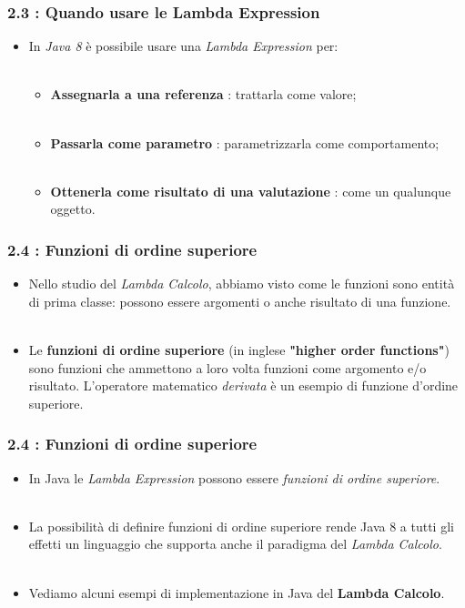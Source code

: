 \documentclass{beamer}
\begin{document}
\begin{frame}
	\frametitle{\textbf{2.3 : Quando usare le Lambda Expression}}
	\begin{itemize}
		\item
			In \textit{Java 8} \`e possibile usare una \textit{Lambda Expression} per:\\\
		\begin{itemize}
			\item
				\textbf{Assegnarla a una referenza} : trattarla come valore;\\\
			\item
				\textbf{Passarla come parametro} : parametrizzarla come comportamento;\\\
			\item
				\textbf{Ottenerla come risultato di una valutazione} : come un qualunque oggetto.
		\end{itemize}
	\end{itemize}
\end{frame}


\begin{frame}
	\frametitle{\textbf{2.4 : Funzioni di ordine superiore}}
	\begin{itemize}
		\item
			Nello studio del \textit{Lambda Calcolo}, abbiamo visto come le funzioni sono entità di prima classe: possono essere argomenti o anche risultato di una funzione.\\\
		\item
			Le \textbf{funzioni di ordine superiore} (in inglese \textbf{"higher order functions"}) sono funzioni che ammettono a loro volta funzioni come argomento e/o risultato. L'operatore matematico \emph{derivata} \`e un esempio di funzione d'ordine superiore.
	\end{itemize}
\end{frame}



\begin{frame}
	\frametitle{\textbf{2.4 : Funzioni di ordine superiore}}
	\begin{itemize}
		\item
			In Java le \textit{Lambda Expression} possono essere \textit{funzioni di ordine superiore}.\\\
		\item
			La possibilità di definire funzioni di ordine superiore rende Java 8 a tutti gli effetti un linguaggio che supporta anche il paradigma del \textit{Lambda Calcolo}.\\\	
		\item Vediamo alcuni esempi di implementazione in Java del \textbf{Lambda Calcolo}.
	\end{itemize}
\end{frame}
\end{document}
